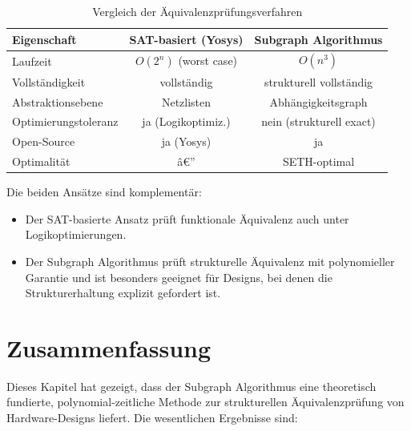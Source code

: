 ﻿\documentclass[12pt,a4paper]{report}
\begin{document}
\begin{table}[H]
\centering
\begin{tabular}{|l|c|c|}
\hline
\textbf{Eigenschaft} & \textbf{SAT-basiert (Yosys)} & \textbf{Subgraph Algorithmus} \\
\hline
Laufzeit & $O(2^n)$ (worst case) & $O(n^3)$ \\
Vollständigkeit & vollständig & strukturell vollständig \\
Abstraktionsebene & Netzlisten & Abhängigkeitsgraph \\
Optimierungstoleranz & ja (Logikoptimiz.) & nein (strukturell exact) \\
Open-Source & ja (Yosys) & ja \\
Optimalität & â€” & SETH-optimal \\
\hline
\end{tabular}
\caption{Vergleich der Äquivalenzprüfungsverfahren}
\end{table}

Die beiden Ansätze sind komplementär:
\begin{itemize}
    \item Der SAT-basierte Ansatz prüft funktionale Äquivalenz auch unter Logikoptimierungen.
    \item Der Subgraph Algorithmus prüft strukturelle Äquivalenz mit polynomieller Garantie und ist besonders geeignet für Designs, bei denen die Strukturerhaltung explizit gefordert ist.
\end{itemize}

\section{Zusammenfassung}

Dieses Kapitel hat gezeigt, dass der Subgraph Algorithmus \cite{subgraph2026} eine theoretisch fundierte, polynomial-zeitliche Methode zur strukturellen Äquivalenzprüfung von Hardware-Designs liefert. Die wesentlichen Ergebnisse sind:
\end{document}
